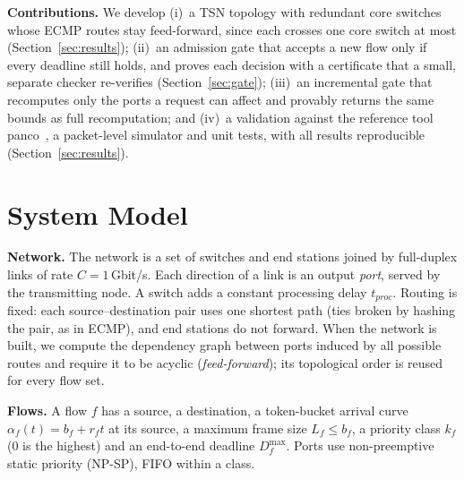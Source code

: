 \documentclass[conference]{IEEEtran}
\begin{document}
\textbf{Contributions.} We develop (i)~a TSN topology with redundant core switches whose ECMP routes stay feed-forward, since each crosses one core switch at most (Section~\ref{sec:results}); (ii)~an admission gate that accepts a new flow only if every deadline still holds, and proves each decision with a certificate that a small, separate checker re-verifies (Section~\ref{sec:gate}); (iii)~an incremental gate that recomputes only the ports a request can affect and provably returns the same bounds as full recomputation; and (iv)~a validation against the reference tool panco~\cite{bouillard2022panco}, a packet-level simulator and unit tests, with all results reproducible (Section~\ref{sec:results}).



\section{System Model}
\label{sec:model}

\textbf{Network.} The network is a set of switches and end stations joined by full-duplex links of rate $C = 1$\,Gbit/s. Each direction of a link is an output \emph{port}, served by the transmitting node. A switch adds a constant processing delay $t_{\mathit{proc}}$. Routing is fixed: each source--destination pair uses one shortest path (ties broken by hashing the pair, as in ECMP), and end stations do not forward. When the network is built, we compute the dependency graph between ports induced by all possible routes and require it to be acyclic (\emph{feed-forward}); its topological order is reused for every flow set.

\textbf{Flows.} A flow $f$ has a source, a destination, a token-bucket arrival curve $\alpha_f(t) = b_f + r_f t$ at its source, a maximum frame size $L_f \le b_f$, a priority class $k_f$ (0 is the highest) and an end-to-end deadline $D^{\max}_f$. Ports use non-preemptive static priority (NP-SP), FIFO within a class.
\end{document}
